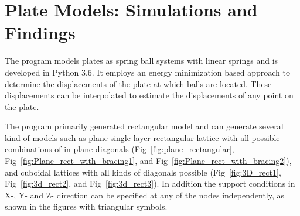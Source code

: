 \chapter{Plate Models: Simulations and Findings}

The program models plates as spring ball systems with linear springs and is developed in Python 3.6. It employs an energy minimization based approach to determine the displacements of the plate at which balls are located. These displacements can be interpolated to estimate the displacements of any point on the plate.

The program primarily generated rectangular model and can generate several kind of models such as plane single layer rectangular lattice with all possible combinations of in-plane diagonals (Fig~\ref{fig:plane_rectangular}, Fig~\ref{fig:Plane_rect_with_bracing1}, and Fig~\ref{fig:Plane_rect_with_bracing2}), and cuboidal lattices with all kinds of diagonals possible (Fig~\ref{fig:3D_rect1}, Fig~\ref{fig:3d_rect2}, and Fig~\ref{fig:3d_rect3}). In addition the support conditions in X-, Y- and Z- direction can be specified at any of the nodes independently, as shown in the figures with triangular symbols.


